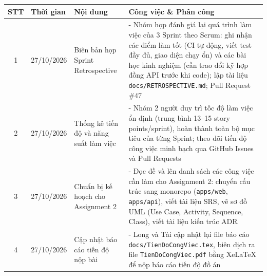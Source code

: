 \documentclass[12pt, a4paper]{article}
\begin{document}
\begin{tabularx}{\textwidth}{|c|p{3.2cm}|Y|Y|}
    \hline
    \textbf{STT} & \textbf{Thời gian} & \textbf{Nội dung} & \textbf{Công việc \& Phân công} \\
    \hline

    1 & 27/10/2026 & Biên bản họp Sprint Retrospective &
    - Nhóm họp đánh giá lại quá trình làm việc của 3 Sprint theo Scrum: ghi nhận các điểm làm tốt (CI tự động, viết test đầy đủ, giao diện chạy ổn) và các bài học kinh nghiệm (cần trao đổi kỹ hợp đồng API trước khi code); lập tài liệu \texttt{docs/RETROSPECTIVE.md}; Pull Request \#47 \\
    \hline

    2 & 27/10/2026 & Thống kê tiến độ và năng suất làm việc &
    - Nhóm 2 người duy trì tốc độ làm việc ổn định (trung bình 13–15 story points/sprint), hoàn thành toàn bộ mục tiêu của từng Sprint; theo dõi tiến độ công việc minh bạch qua GitHub Issues và Pull Requests \\
    \hline

    3 & 27/10/2026 & Chuẩn bị kế hoạch cho Assignment 2 &
    - Đọc đề và lên danh sách các công việc cần làm cho Assignment 2: chuyển cấu trúc sang monorepo (\texttt{apps/web}, \texttt{apps/api}), viết tài liệu SRS, vẽ sơ đồ UML (Use Case, Activity, Sequence, Class), viết tài liệu kiến trúc ADR \\
    \hline

    4 & 27/10/2026 & Cập nhật báo cáo tiến độ nộp bài &
    - Long và Tài cập nhật lại file báo cáo \texttt{docs/TienDoCongViec.tex}, biên dịch ra file \texttt{TienDoCongViec.pdf} bằng XeLaTeX để nộp báo cáo tiến độ đồ án \\
    \hline
\end{tabularx}

\vspace{0.8cm}
\end{document}
